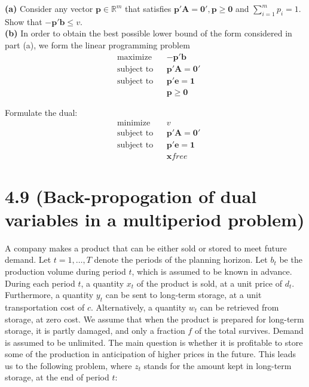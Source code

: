 \documentclass{article}
\begin{document}
\noindent
\textbf{(a)} Consider any vector $\mathbf{p} \in \mathbb{R}^m$ that satisfies $\mathbf{p'A = 0', p \geq 0}$ and $\sum_{i=1}^m p_i = 1$.  Show that $\mathbf{-p'b} \leq v$. \\


\noindent
\textbf{(b)}  In order to obtain the best possible lower bound of the form considered in part (a), we form the linear programming problem
\begin{equation*}
\begin{aligned}
& \text{maximize} && \mathbf{-p'b} \\
& \text{subject to} &&  \mathbf{p'A = 0'} \\
& \text{subject to} &&  \mathbf{p'e = 1} \\
& & &\mathbf{p \geq 0}
\end{aligned}
\end{equation*}

\noindent
Formulate the dual:
\begin{equation*}
\begin{aligned}
& \text{minimize} && v \\
& \text{subject to} &&  \mathbf{p'A = 0'} \\
& \text{subject to} &&  \mathbf{p'e = 1} \\
& & &\mathbf{x} free
\end{aligned}
\end{equation*}

\section*{4.9 (Back-propogation of dual variables in a multiperiod problem)}
A company makes a product that can be either sold or stored to meet future demand.  Let $t = 1, \ldots, T$ denote the periods of the planning horizon.  Let $b_t$ be the production volume during period $t$, which is assumed to be known in advance.  During each period $t$, a quantity $x_t$ of the product is sold, at a unit price of $d_t$.  Furthermore, a quantity $y_t$ can be sent to long-term storage, at a unit transportation cost of $c.$  Alternatively, a quantity $w_t$ can be retrieved from storage, at zero cost.  We assume that when the product is prepared for long-term storage, it is partly damaged, and only a fraction $f$ of the total survives.  Demand is assumed to be unlimited.  The main question is whether it is profitable to store some of the production in anticipation of higher prices in the future.  This leads us to the following problem, where $z_t$ stands for the amount kept in long-term storage, at the end of period $t$: \\
\end{document}
